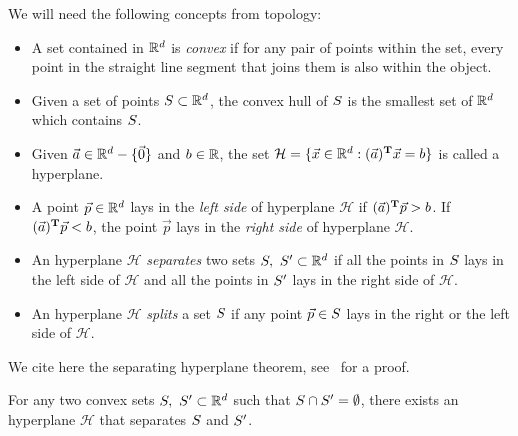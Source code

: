 \documentclass{article}
\newcommand{\cH}{\mathcal{H}}
\begin{document}
We will need the following concepts from topology:
\begin{itemize}
\item A  set contained in $\mathbb{R}^d$  is \textit{convex} if for any
  pair of points within the set, every point in the straight line
  segment that joins them is also within the object.
\item Given a set of points $S\subset\mathbb{R}^{d}$, the convex hull of $S$ is the
  smallest set of $\mathbb{R}^{d}$ which contains $S$.
\item   Given $\vec{a}\in\mathbb{R}^d-\{\vec{0}\}$ and $b\in\mathbb{R}$, the set 
  $\cH = \{\vec{x}\in\RR^d : \transpose{\vec{a}}\vec{x}=b\}$ is called
  a hyperplane.
\item A point $\vec{p}\in\mathbb{R}^{d}$ lays in the \textit{left side} of
  hyperplane $\cH$ if $(\vec{a})^{\textbf{T}}\vec{p}>b$. If 
  $(\vec{a})^{\textbf{T}}\vec{p} < b$, the point $\vec{p}$ lays  in the
  \textit{right side} of hyperplane $\cH$.
\item An hyperplane $\cH$ \textit{separates} two sets $S,\
  S'\subset\mathbb{R}^d$ if all the points in $S$ lays in the left side
  of $\cH$ and all the points in $S'$ lays in the right side of
  $\cH$.
\item An hyperplane $\cH$ \textit{splits} a set $S$ if any point
  $\vec{p}\in S$ lays in the right or the left side of $\cH$. 
\end{itemize}
We cite here  the separating hyperplane theorem, 
see~\cite[page 46]{BoydLieven04} for a proof. 
\begin{lemma}
  \label{lem:maximum_separation}
  For any two convex sets $S,\ S'\subset \mathbb{R}^d$ such that
  $S\cap S' =  \emptyset$,  there exists an   hyperplane $\cH$
  that separates $S$ and $S'$.
\end{lemma}
\end{document}
